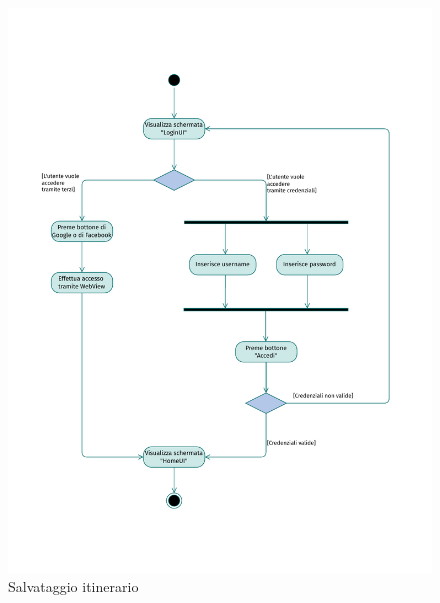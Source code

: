 \documentclass{natourDoc}
\begin{document}
\newpage
\begin{figure}[!htbp]
	\centering
	\includegraphics[width=\textwidth, page=11]{./diagrams/activity.pdf}
	\caption{Salvataggio itinerario}
\end{figure}
\FloatBarrier
\end{document}

